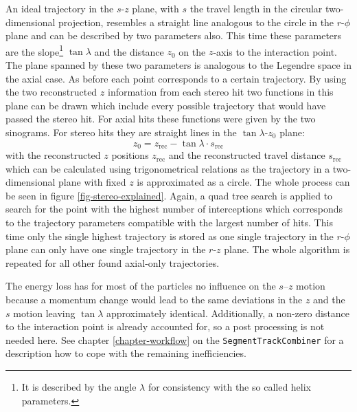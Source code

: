 An ideal trajectory in the $s$-$z$ plane, with $s$ the travel length in the circular two-dimensional projection, resembles a straight line analogous to the circle in the $r$-$\phi$ plane and can be described by two parameters also. This time these parameters are the slope\footnote{It is described by the angle $\lambda$ for consistency with the so called helix parameters.} $\tan \lambda$ and the distance $z_0$ on the $z$-axis to the interaction point. The plane spanned by these two parameters is analogous to the Legendre space in the axial case. As before each point corresponds to a certain trajectory. By using the two reconstructed $z$ information from each stereo hit two functions in this plane can be drawn which include every possible trajectory that would have passed the stereo hit. For axial hits these functions were given by the two sinograms. For stereo hits they are straight lines in the $\tan \lambda$-$z_0$ plane:
$$ z_0 = z_\text{rec} - \tan \lambda \cdot s_\text{rec} $$
with the reconstructed $z$ positions $z_\text{rec}$ and the reconstructed travel distance $s_\text{rec}$ which can be calculated using trigonometrical relations as the trajectory in a two-dimensional plane with fixed $z$ is approximated as a circle. The whole process can be seen in figure \ref{fig-stereo-explained}. Again, a quad tree search is applied to search for the point with the highest number of interceptions which corresponds to the trajectory parameters compatible with the largest number of hits. This time only the single highest trajectory is stored as one single trajectory in the $r$-$\phi$ plane can only have one single trajectory in the $r$-$z$ plane. The whole algorithm is repeated for all other found axial-only trajectories. 

The energy loss has for most of the particles no influence on the $s$--$z$ motion because a momentum change would lead to the same deviations in the $z$ and the $s$ motion leaving $\tan \lambda$ approximately identical. Additionally, a non-zero distance to the interaction point is already accounted for, so a post processing is not needed here. See chapter \ref{chapter-workflow} on the \texttt{SegmentTrackCombiner} for a description how to cope with the remaining inefficiencies.


